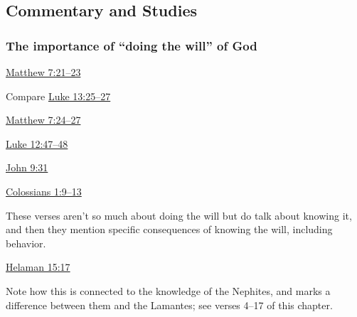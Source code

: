 	
\subsection{Commentary and Studies} %
	\label{WILL-COMMENTARY}

	
		
	\subsubsection{The importance of ``doing the will'' of God}
		\label{WILL-doing}
		
		\begin{compactitem}
			\item \hyperref[MATTHEW-7-21]{Matthew 7:21--23}
				\begin{compactitem}
					\item Compare \hyperref[LUKE-13-25]{Luke 13:25--27}
				\end{compactitem}
			\item \hyperref[MATTHEW-7-24]{Matthew 7:24--27}
			\item \hyperref[LUKE-12-47]{Luke 12:47--48}
			\item \hyperref[JOHN-9-31]{John 9:31}
			\item \hyperref[COLOSSIANS-1-9]{Colossians 1:9--13}
				\begin{compactitem}
					\item These verses aren't so much about doing the will but do talk about knowing it, and then they mention specific consequences of knowing the will, including behavior.
				\end{compactitem} 
			\item \hyperref[HELAMAN-15-17]{Helaman 15:17}
				\begin{compactitem}
					\item Note how this is connected to the knowledge of the Nephites, and marks a difference between them and the Lamantes; see verses 4--17 of this chapter.
				\end{compactitem}
		\end{compactitem}	
